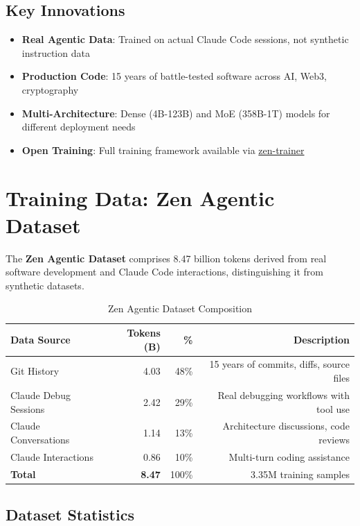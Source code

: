 \documentclass[11pt,a4paper]{article}
\begin{document}
\subsection{Key Innovations}
\begin{itemize}
    \item \textbf{Real Agentic Data}: Trained on actual Claude Code sessions, not synthetic instruction data
    \item \textbf{Production Code}: 15 years of battle-tested software across AI, Web3, cryptography
    \item \textbf{Multi-Architecture}: Dense (4B-123B) and MoE (358B-1T) models for different deployment needs
    \item \textbf{Open Training}: Full training framework available via \href{https://github.com/zenlm/zen-trainer}{zen-trainer}
\end{itemize}

\section{Training Data: Zen Agentic Dataset}

The \textbf{Zen Agentic Dataset} comprises 8.47 billion tokens derived from real software development
and Claude Code interactions, distinguishing it from synthetic datasets.

\begin{table}[H]
\centering
\begin{tabular}{lrrr}
\toprule
\textbf{Data Source} & \textbf{Tokens (B)} & \textbf{\%} & \textbf{Description} \\
\midrule
Git History & 4.03 & 48\% & 15 years of commits, diffs, source files \\
Claude Debug Sessions & 2.42 & 29\% & Real debugging workflows with tool use \\
Claude Conversations & 1.14 & 13\% & Architecture discussions, code reviews \\
Claude Interactions & 0.86 & 10\% & Multi-turn coding assistance \\
\midrule
\textbf{Total} & \textbf{8.47} & 100\% & 3.35M training samples \\
\bottomrule
\end{tabular}
\caption{Zen Agentic Dataset Composition}
\end{table}

\subsection{Dataset Statistics}
\end{document}
